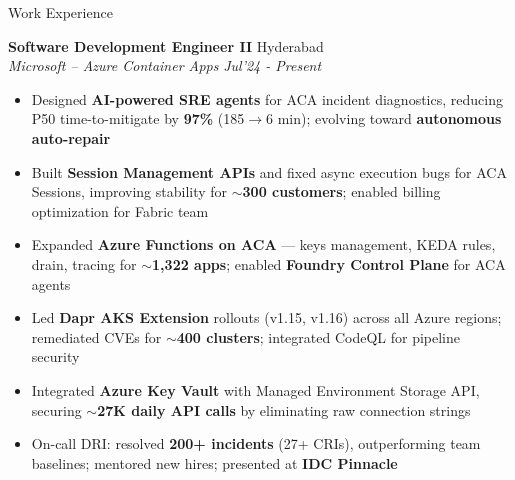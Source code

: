 \documentclass[9pt]{extarticle}
\newcommand{\cvsection}[1]{
  \vspace{4mm}
  {\sc \fontsize{9.5pt}{11pt}\selectfont #1}
  \vspace{-1.5mm}
  \hrulefill
  \vspace{2mm}
}
\newcommand{\cventry}[4]{
  {\small \textbf{#1}} \hfill {\footnotesize #3} \\[-1.5pt]
  {\small \emph{#2}} \hfill {\footnotesize \emph{#4}}
}
\begin{document}
\begin{minipage}[t]{0.485\textwidth}
\vspace{0mm}

\cvsection{Work Experience}

\cventry{Software Development Engineer II}
{Microsoft -- Azure Container Apps}
{Hyderabad}{Jul'24 - Present}
\vspace{0.5mm}
\begin{itemize}
  \item Designed \textbf{AI-powered SRE agents} for
    ACA incident diagnostics, reducing P50
    time-to-mitigate by \textbf{97\%} (185$\rightarrow$6 min);
    evolving toward \textbf{autonomous auto-repair}
  \item Built \textbf{Session Management APIs} and
    fixed async execution bugs for ACA Sessions,
    improving stability for \textbf{$\sim$300 customers};
    enabled billing optimization for Fabric team
  \item Expanded \textbf{Azure Functions on ACA} ---
    keys management, KEDA rules, drain, tracing
    for \textbf{$\sim$1,322 apps}; enabled
    \textbf{Foundry Control Plane} for ACA agents
  \item Led \textbf{Dapr AKS Extension} rollouts
    (v1.15, v1.16) across all Azure regions;
    remediated CVEs for \textbf{$\sim$400 clusters};
    integrated CodeQL for pipeline security
  \item Integrated \textbf{Azure Key Vault} with
    Managed Environment Storage API, securing
    \textbf{$\sim$27K daily API calls} by eliminating
    raw connection strings
  \item On-call DRI: resolved \textbf{200+ incidents}
    (27+ CRIs), outperforming team baselines;
    mentored new hires; presented at
    \textbf{IDC Pinnacle}
\end{itemize}

\vspace{3mm}


\end{minipage}
\end{document}
